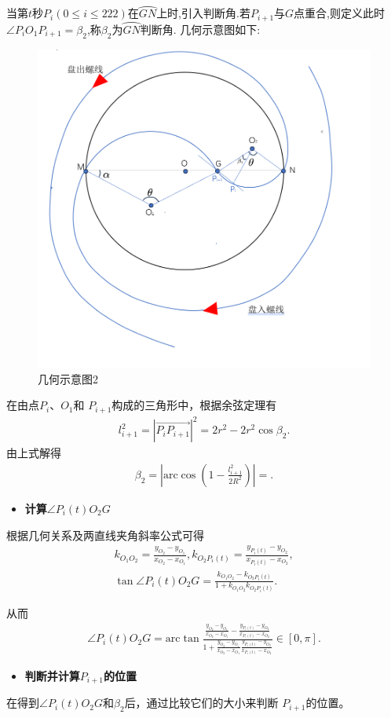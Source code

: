 \documentclass[../main.tex]{subfiles}
\begin{document}
\par 当第$t$秒$P_i(0\leq i\leq 222)$在$\wideparen{GN}$上时,引入判断角.若$P_{i+1}$与$G$点重合,则定义此时$\angle P_iO_1P_{i+1}=\beta_2$,称$\beta_2$为$\wideparen{GN}$判断角. 几何示意图如下:
\begin{figure}[H]
    \centering
    \includegraphics[width=.6\textwidth]{几何示意图2}
    \caption{几何示意图2}
\end{figure}
\par 在由点$ P_{i}、O_{1} $和 $P_{i + 1} $构成的三角形中，根据余弦定理有
\begin{align}\label{1.........448}
l_{i+1}^{2}=\left| \overrightarrow{P_iP_{i+1}} \right|^2=2r^2-2r^2\cos \beta _2.
\end{align}
由上式解得
\begin{align}\label{1.........449}
\beta _2=\left| \mathrm{arc}\cos \left( 1-\frac{l_{i+1}^{2}}{2R^2} \right) \right|=.
\end{align}

\begin{itemize}
    \item \textbf{计算$\angle P_{i}(t)O_2G$}
    \end{itemize}

\par 根据几何关系及两直线夹角斜率公式可得
\begin{gather}\label{1.........450}
k_{O_1O_2}=\frac{y_{O_2}-y_{O_1}}{x_{O_2}-x_{O_1}},k_{O_2P_i\left( t \right)}=\frac{y_{P_i\left( t \right)}-y_{O_2}}{x_{P_i\left( t \right)}-x_{O_2}},
\\
\tan \angle P_i(t)O_2G=\frac{k_{O_1O_2}-k_{O_2P_i\left( t \right)}}{1+k_{O_1O_2}k_{O_2P_i\left( t \right)}}.
\end{gather}
\par 从而
\begin{align}\label{1.........451}
\angle P_i(t)O_2G=\mathrm{arc}\tan \frac{\frac{y_{O_2}-y_{O_1}}{x_{O_2}-x_{O_1}}-\frac{y_{P_i\left( t \right)}-y_{O_2}}{x_{P_i\left( t \right)}-x_{O_2}}}{1+\frac{y_{O_2}-y_{O_1}}{x_{O_2}-x_{O_1}}\frac{y_{P_i\left( t \right)}-y_{O_2}}{x_{P_i\left( t \right)}-x_{O_2}}}\in[0,\pi].
\end{align}
\begin{itemize}
    \item \textbf{判断并计算$P_{i+1}$的位置}
\end{itemize}
\par 在得到$\angle P_{i}(t)O_{2}G $和$\beta_{2} $后，通过比较它们的大小来判断 $P_{i + 1} $的位置。
 
\end{document}
